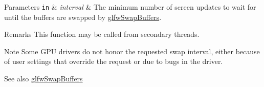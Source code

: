 \begin{DoxyParams}[1]{\-Parameters}
\mbox{\tt in}  & {\em interval} & \-The minimum number of screen updates to wait for until the buffers are swapped by \hyperlink{group__context_gafb827800eedbfcbc97b1e5408df668d7}{glfw\-Swap\-Buffers}.\\
\hline
\end{DoxyParams}
\begin{DoxyRemark}{\-Remarks}
\-This function may be called from secondary threads.
\end{DoxyRemark}
\begin{DoxyNote}{\-Note}
\-Some \-G\-P\-U drivers do not honor the requested swap interval, either because of user settings that override the request or due to bugs in the driver.
\end{DoxyNote}
\begin{DoxySeeAlso}{\-See also}
\hyperlink{group__context_gafb827800eedbfcbc97b1e5408df668d7}{glfw\-Swap\-Buffers} 
\end{DoxySeeAlso}
